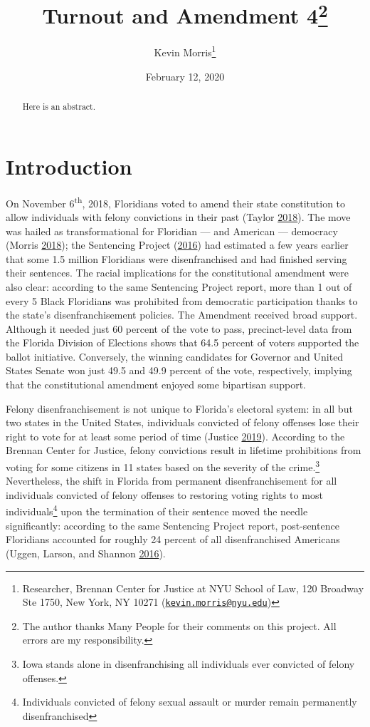 \documentclass[
  12pt,
]{article}
\title{Turnout and Amendment 4\thanks{The author thanks Many People for their comments on this project. All errors are my responsibility.}}
\author{Kevin Morris\footnote{Researcher, Brennan Center for Justice at NYU School of Law, 120 Broadway Ste 1750, New York, NY 10271 (\href{mailto:kevin.morris@nyu.edu}{\nolinkurl{kevin.morris@nyu.edu}})}}
\date{February 12, 2020}
\begin{document}
\maketitle
\begin{abstract}
Here is an abstract.
\end{abstract}

\pagebreak


\hypertarget{introduction}{%
\section*{Introduction}\label{introduction}}

On November 6\textsuperscript{th}, 2018, Floridians voted to amend their state constitution to allow individuals with felony convictions in their past (Taylor \protect\hyperlink{ref-Taylor2018}{2018}). The move was hailed as transformational for Floridian --- and American --- democracy (Morris \protect\hyperlink{ref-Morris2018}{2018}); the Sentencing Project (\protect\hyperlink{ref-sentencing_2016}{2016}) had estimated a few years earlier that some 1.5 million Floridians were disenfranchised and had finished serving their sentences. The racial implications for the constitutional amendment were also clear: according to the same Sentencing Project report, more than 1 out of every 5 Black Floridians was prohibited from democratic participation thanks to the state's disenfranchisement policies. The Amendment received broad support. Although it needed just 60 percent of the vote to pass, precinct-level data from the Florida Division of Elections shows that 64.5 percent of voters supported the ballot initiative. Conversely, the winning candidates for Governor and United States Senate won just 49.5 and 49.9 percent of the vote, respectively, implying that the constitutional amendment enjoyed some bipartisan support.

Felony disenfranchisement is not unique to Florida's electoral system: in all but two states in the United States, individuals convicted of felony offenses lose their right to vote for at least some period of time (Justice \protect\hyperlink{ref-bcj_laws}{2019}). According to the Brennan Center for Justice, felony convictions result in lifetime prohibitions from voting for some citizens in 11 states based on the severity of the crime.\footnote{Iowa stands alone in disenfranchising all individuals ever convicted of felony offenses.} Nevertheless, the shift in Florida from permanent disenfranchisement for all individuals convicted of felony offenses to restoring voting rights to most individuals\footnote{Individuals convicted of felony sexual assault or murder remain permanently disenfranchised} upon the termination of their sentence moved the needle significantly: according to the same Sentencing Project report, post-sentence Floridians accounted for roughly 24 percent of all disenfranchised Americans (Uggen, Larson, and Shannon \protect\hyperlink{ref-sentencing_2016}{2016}).
\end{document}
